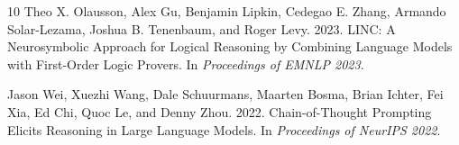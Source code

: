 \documentclass[11pt,a4paper]{article}
\begin{document}
\begin{thebibliography}{10}
Theo X. Olausson, Alex Gu, Benjamin Lipkin, Cedegao E. Zhang, Armando Solar-Lezama, Joshua B. Tenenbaum, and Roger Levy. 2023.
\newblock LINC: A Neurosymbolic Approach for Logical Reasoning by Combining Language Models with First-Order Logic Provers.
\newblock In \emph{Proceedings of EMNLP 2023}.

Jason Wei, Xuezhi Wang, Dale Schuurmans, Maarten Bosma, Brian Ichter, Fei Xia, Ed Chi, Quoc Le, and Denny Zhou. 2022.
\newblock Chain-of-Thought Prompting Elicits Reasoning in Large Language Models.
\newblock In \emph{Proceedings of NeurIPS 2022}.

\end{thebibliography}
\end{document}
